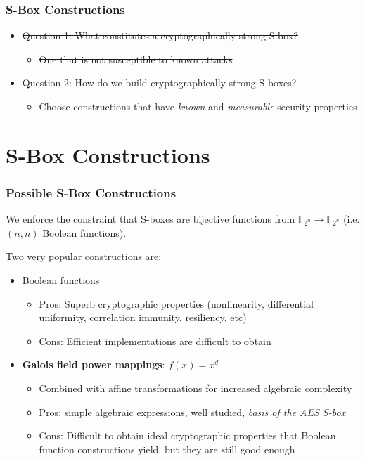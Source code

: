 \documentclass[handout,10pt]{beamer}
\begin{document}
\begin{frame}
\frametitle{S-Box Constructions}
	\begin{itemize}
		\item \sout{Question 1: What constitutes a cryptographically strong S-box?}
		\medskip
		\begin{itemize}
			\item \sout{One that is not susceptible to known attacks}
		\end{itemize}
		\medskip
		\item Question 2: How do we build cryptographically strong S-boxes?
		\medskip
		\begin{itemize}
			\item Choose constructions that have \emph{known} and \emph{measurable} security properties
		\end{itemize}
	\end{itemize}
\end{frame}

\section{S-Box Constructions}
\begin{frame}
	\frametitle{Possible S-Box Constructions}
	We enforce the constraint that S-boxes are bijective functions from $\mathbb{F}_{2^n} \to \mathbb{F}_{2^n}$ (i.e. $(n,n)$ Boolean functions).

	\medskip

	Two very popular constructions are:
	\begin{itemize}
		\item Boolean functions
		\begin{itemize}
			\item Pros: Superb cryptographic properties (nonlinearity, differential uniformity, correlation immunity, resiliency, etc)
			\item Cons: Efficient implementations are difficult to obtain
		\end{itemize}
		\pause
		\item \textbf{Galois field power mappings}: $f(x) = x^d$
		\begin{itemize}
			\item Combined with affine transformations for increased algebraic complexity
			\item Pros: simple algebraic expressions, well studied, \emph{basis of the AES S-box}
			\item Cons: Difficult to obtain ideal cryptographic properties that Boolean function constructions yield, but they are still good enough
		\end{itemize}
	\end{itemize}
\end{frame}
\end{document}
